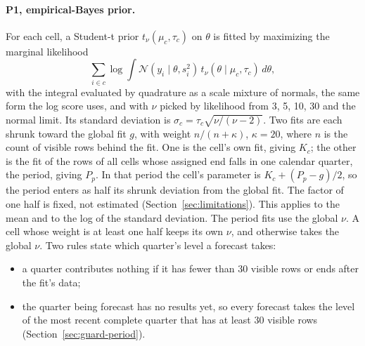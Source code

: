 \documentclass[sigconf,nonacm]{acmart}
\newif\iftmlr
\begin{document}
\paragraph{P1, empirical-Bayes prior.} For each cell, a Student-t prior $t_\nu(\mu_c, \tau_c)$ on $\theta$ is fitted by maximizing the marginal likelihood
\begin{equation}
\sum_{i \in c} \log \int \mathcal{N}(y_i \mid \theta, s_i^2)\, t_\nu(\theta \mid \mu_c, \tau_c)\, d\theta ,
\end{equation}
with the integral evaluated by quadrature as a scale mixture of normals, the same form the log score uses, and with $\nu$ picked by likelihood from 3, 5, 10, 30 and the normal limit. Its standard deviation is $\sigma_c = \tau_c\sqrt{\nu/(\nu-2)}$.
Two fits are each shrunk toward the global fit $g$, with weight $n / (n + \kappa)$, $\kappa = 20$, where $n$ is the count of visible rows behind the fit. One is the cell's own fit, giving $K_c$; the other is the fit of the rows of all cells whose assigned end falls in one calendar quarter, the period, giving $P_p$. In that period the cell's parameter is $K_c + (P_p - g)/2$, so the period enters as half its shrunk deviation from the global fit. The factor of one half is fixed, not estimated (\iftmlr Appendix~\ref{sec:more-limits}\else Section~\ref{sec:limitations}\fi). This applies to the mean and to the log of the standard deviation. The period fits use the global $\nu$. A cell whose weight is at least one half keeps its own $\nu$, and otherwise takes the global $\nu$. Two rules state which quarter's level a forecast takes:
\begin{itemize}
\item a quarter contributes nothing if it has fewer than 30 visible rows or ends after the fit's data;
\item the quarter being forecast has no results yet, so every forecast takes the level of the most recent complete quarter that has at least 30 visible rows (Section~\ref{sec:guard-period}).
\end{itemize}
\end{document}
